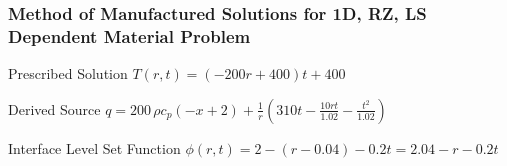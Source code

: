 \documentclass[]{beamer}
\begin{document}
\begin{frame}[t]\frametitle{Method of Manufactured Solutions for 1D, RZ, LS Dependent Material Problem}
  \begin{block}{Prescribed Solution}
    $T(r,t) = (-200r+400)t + 400$
  \end{block}
  
  \begin{block}{Derived Source}
  $q = 200\,\rho c_p \left(-x+2\right) + \frac{1}{r}\left( 310t - \frac{10rt}{1.02} - \frac{t^2}{1.02}\right)$
  \end{block}
  
  \begin{block}{Interface Level Set Function}
    $\phi(r,t) = 2 - (r - 0.04) - 0.2t = 2.04 - r - 0.2t$
  \end{block}
\end{frame}
\end{document}
